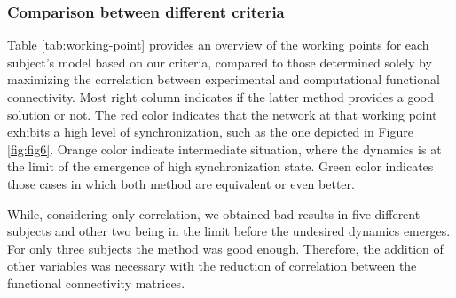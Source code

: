 \documentclass[../main.tex]{subfiles}
\begin{document}
\subsubsection{Comparison between different criteria}
Table \ref{tab:working-point} provides an overview of the working points for each subject's model based on our criteria, compared to those determined solely by maximizing the correlation between experimental and computational functional connectivity.
Most right column indicates if the latter method provides a good solution or not.
The red color indicates that the network at that working point exhibits a high level of synchronization, such as the one depicted in Figure \ref{fig:fig6}.
Orange color indicate intermediate situation, where the dynamics is at the limit of the emergence of high synchronization state.
Green color indicates those cases in which both method are equivalent or even better.

While, considering only correlation, we obtained bad results in five different subjects and other two being in the limit before the undesired dynamics emerges.
For only three subjects the method was good enough.
Therefore, the addition of other variables was necessary with the reduction of correlation between the functional connectivity matrices.
\end{document}
